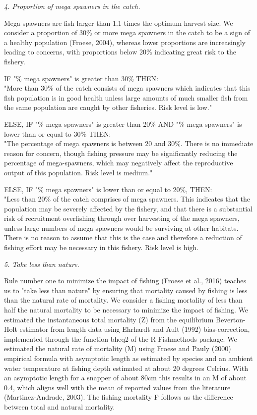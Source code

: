 \textit{4. Proportion of mega spawners in the catch.}

Mega spawners are fish larger than 1.1 times the optimum harvest size. We consider a proportion of 30\% or more mega spawners in the catch to be a sign of a healthy population (Froese, 2004), whereas lower proportions are increasingly leading to concerns, with proportions below 20\% indicating great risk to the fishery.

IF "\% mega spawners" is greater than 30\% THEN:\\[0cm]
"More than 30\% of the catch consists of mega spawners which indicates that this fish population is in good health unless large amounts of much smaller fish from the same population are caught by other fisheries. Risk level is low."

\clearpage
\newpage

ELSE, IF "\% mega spawners" is greater than 20\% AND "\% mega spawners" is lower than or equal to 30\% THEN:\\[0cm]
"The percentage of mega spawners is between 20 and 30\%.  There is no immediate reason for concern, though fishing pressure may be significantly reducing the percentage of mega-spawners, which may negatively affect the reproductive output of this population. Risk level is medium."

ELSE, IF "\% mega spawners" is lower than or equal to 20\%, THEN:\\[0cm]
"Less than 20\% of the catch comprises of mega spawners.  This indicates that the population may be severely affected by the fishery, and that there is a substantial risk of recruitment overfishing through over harvesting of the mega spawners, unless large numbers of mega spawners would be surviving at other habitats. There is no reason to assume that this is the case and therefore a reduction of fishing effort may be necessary in this fishery. Risk level is high.

\textit{5. Take less than nature.}

Rule number one to minimize the impact of fishing (Froese et al., 2016) teaches us to "take less than nature" by ensuring that mortality caused by fishing is less than the natural rate of mortality. We consider a fishing mortality of less than half the natural mortality to be necessary to minimize the impact of fishing. We estimated the instantaneous total mortality (Z) from the equilibrium Beverton-Holt estimator from length data using Ehrhardt and Ault (1992) bias-correction, implemented through the function bheq2 of the R Fishmethods package. We estimated the natural rate of mortality (M) using Froese and Pauly (2000) empirical formula with asymptotic length as estimated by species and an ambient water temperature at fishing depth estimated at about 20 degrees Celcius. With an asymptotic length for a snapper of about 80cm this results in an M of about 0.4, which aligns well with the mean of reported values from the literature (Martinez-Andrade, 2003). The fishing mortality F follows as the difference between total and natural mortality.


